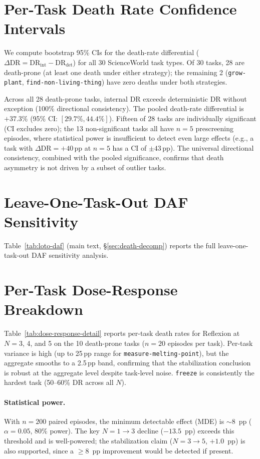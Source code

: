 \documentclass[11pt]{article}
\begin{document}
\section{Per-Task Death Rate Confidence Intervals}
\label{app:per-task-ci}

We compute bootstrap 95\% CIs for the death-rate differential ($\Delta\text{DR} = \text{DR}_{\text{int}} - \text{DR}_{\text{det}}$) for all 30 ScienceWorld task types. Of 30 tasks, 28 are death-prone (at least one death under either strategy); the remaining 2 (\texttt{grow-plant}, \texttt{find-non-living-thing}) have zero deaths under both strategies.

Across all 28 death-prone tasks, internal DR exceeds deterministic DR without exception (100\% directional consistency). The pooled death-rate differential is $+37.3\%$ (95\% CI: $[29.7\%, 44.4\%]$). Fifteen of 28 tasks are individually significant (CI excludes zero); the 13 non-significant tasks all have $n{=}5$ prescreening episodes, where statistical power is insufficient to detect even large effects (e.g., a task with $\Delta\text{DR} = +40$\,pp at $n{=}5$ has a CI of $\pm 43$\,pp). The universal directional consistency, combined with the pooled significance, confirms that death asymmetry is not driven by a subset of outlier tasks.

\section{Leave-One-Task-Out DAF Sensitivity}
\label{app:loto-daf}

Table~\ref{tab:loto-daf} (main text, \S\ref{sec:death-decomp}) reports the full leave-one-task-out DAF sensitivity analysis.

\section{Per-Task Dose-Response Breakdown}
\label{app:dose-response}

Table~\ref{tab:dose-response-detail} reports per-task death rates for Reflexion at $N{=}3$, 4, and 5 on the 10 death-prone tasks ($n{=}20$ episodes per task). Per-task variance is high (up to 25\,pp range for \texttt{measure-melting-point}), but the aggregate smooths to a 2.5\,pp band, confirming that the stabilization conclusion is robust at the aggregate level despite task-level noise. \texttt{freeze} is consistently the hardest task (50--60\% DR across all $N$).

\paragraph{Statistical power.} With $n{=}200$ paired episodes, the minimum detectable effect (MDE) is ${\sim}8$~pp ($\alpha = 0.05$, 80\% power). The key $N{=}1{\to}3$ decline ($-13.5$~pp) exceeds this threshold and is well-powered; the stabilization claim ($N{=}3{\to}5$, $+1.0$~pp) is also supported, since a ${\geq}8$~pp improvement would be detected if present.
\end{document}
